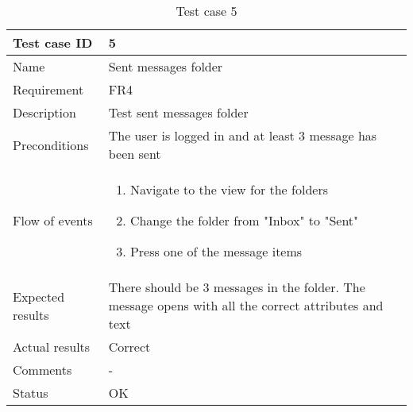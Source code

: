 		\begin{table}[htb]
			\begin{tabular}{l|p{10cm}}
				Test case ID & 5 \\ \hline
				Name & Sent messages folder\\ \hline
				Requirement & FR4\\ \hline
				Description & Test sent messages folder\\ \hline
				Preconditions & The user is logged in and at least 3 message has been sent\\ \hline
				Flow of events & 
					\begin{enumerate}
						\item{}Navigate to the view for the folders
						\item{}Change the folder from "Inbox" to "Sent"
						\item{}Press one of the message items
					\end{enumerate} \\ \hline
				Expected results & There should be 3 messages in the folder. The message opens with all the correct 							attributes and text\\ \hline
				Actual results & Correct\\ \hline
				Comments &-\\ \hline
				Status &OK \\ \hline
			\end{tabular}
			\caption{Test case 5} \label{tab:case5}
		\end{table}

